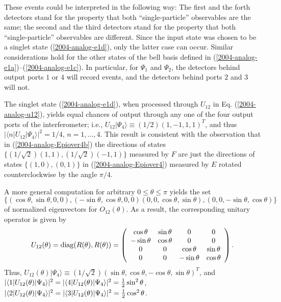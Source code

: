 \documentclass[pra,preprint,showpacs,showkeys,amsfonts]{revtex4}
\begin{document}
These events could be interpreted in the following way:
The first and the forth detectors stand for the property
that both ``single-particle'' observables are the same;
the second and the third detectors stand for the property
that both ``single-particle'' observables are  different.
Since the input state was chosen to be a singlet state (\ref{2004-analog-e1d}),
only the latter case can occur.
Similar considerations hold for the
other states of the bell basis defined in
(\ref{2004-analog-e1a})--(\ref{2004-analog-e1c}).
In particular, for $\Psi_1$ and $\Psi_2$,
the detectors behind output ports
$1$ or $4$ will record events, and the detectors behind ports $2$ and $3$
will not.


The singlet state (\ref{2004-analog-e1d}),
when processed through $U_{12}$ in Eq. (\ref{2004-analog-u12}),
yields equal chances of output
through any one of the four output ports of the interferometer; i.e.,
$U_{12}\vert \Psi_4\rangle \equiv (1/2)(1,-1,1,1)^T$,
and thus
$\vert \langle n \vert U_{12}\vert \Psi_4\rangle \vert^2 =1/4$,
$n=1,\ldots , 4$.
This result is consistent with the observation that
in
(\ref{2004-analog-Epiover4b})
the directions of states
$\{(1/\sqrt{2})(1,1),(1/\sqrt{2})(-1,1)\}$ measured by $F$
are just the directions of states
$\{(1,0),(0,1)\}$
in
(\ref{2004-analog-Epiover4})
measured by
$E$
rotated counterclockwise by the angle $\pi /4$.


A more general computation for arbitrary $0\le \theta \le \pi$
yields the  set
\[
\{
(\cos \theta , \sin \theta , 0, 0),
(-\sin \theta , \cos \theta , 0, 0)
(0, 0, \cos \theta , \sin \theta ),
(0, 0, -\sin \theta , \cos \theta )
\}
\]
of normalized eigenvectors for $O_{12}(\theta )$.
As a result, the corresponding unitary operator is given by
\begin{equation}
U_{12}(\theta ) =  {\rm diag}(R(\theta ),R(\theta)) =
\left(
\begin{array}{cccc}
\cos \theta & \sin \theta & 0& 0\\
-\sin \theta & \cos \theta & 0& 0\\
0& 0& \cos \theta & \sin \theta \\
0& 0& -\sin \theta & \cos \theta
\end{array}
\right)
.        \label{2004-analog-eunop12theta}
\end{equation}
Thus,
$U_{12}(\theta ) \vert \Psi_4\rangle \equiv  (1/\sqrt{2})
(\sin \theta ,\cos \theta ,-\cos \theta ,\sin \theta )^T$, and
$
\vert \langle 1 \vert U_{12}(\theta )\vert \Psi_4\rangle \vert^2 =
\vert \langle 4 \vert U_{12}(\theta )\vert \Psi_4\rangle \vert^2 =
{1\over 2}\sin^2 \theta$,
$
\vert \langle 2 \vert U_{12}(\theta )\vert \Psi_4\rangle \vert^2 =
\vert \langle 3 \vert U_{12}(\theta )\vert \Psi_4\rangle \vert^2 =
{1\over 2}\cos^2 \theta
$.
\end{document}
